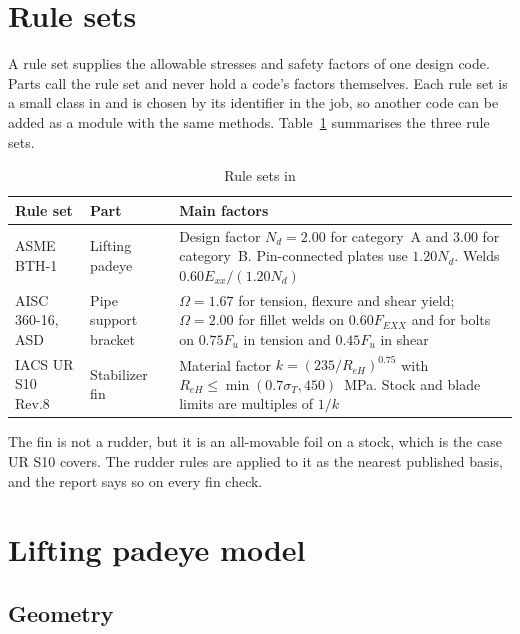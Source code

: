 \section{Rule sets}
\label{sec:rule-sets}

A rule set supplies the allowable stresses and safety factors of one design
code. Parts call the rule set and never hold a code's factors themselves. Each
rule set is a small class in  and is chosen by its identifier
in the job, so another code can be added as a module with the same methods.
Table~\ref{tab:rule-sets} summarises the three rule sets.

\begin{table}[H]
\centering
\caption{Rule sets in \NEMO{}}
\label{tab:rule-sets}
\small
\begin{tabularx}{\textwidth}{>{\raggedright\arraybackslash}p{}>{\raggedright\arraybackslash}p{}X}
\toprule
\textbf{Rule set} & \textbf{Part} & \textbf{Main factors}\\
\midrule
ASME BTH-1 \cite{asmeBTH1} & Lifting padeye & Design factor $N_d = 2.00$ for category~A and $3.00$ for category~B. Pin-connected plates use $1.20N_d$. Welds $0.60E_{xx}/(1.20N_d)$\\
AISC 360-16, ASD \cite{aisc2016} & Pipe support bracket & $\Omega = 1.67$ for tension, flexure and shear yield; $\Omega = 2.00$ for fillet welds on $0.60F_{EXX}$ and for bolts on $0.75F_u$ in tension and $0.45F_u$ in shear\\
IACS UR S10 Rev.8 \cite{iacsS10} & Stabilizer fin & Material factor $k = (235/R_{eH})^{0.75}$ with $R_{eH} \leq \min(0.7\sigma_T, 450)$~MPa. Stock and blade limits are multiples of $1/k$\\
\bottomrule
\end{tabularx}
\end{table}

The fin is not a rudder, but it is an all-movable foil on a stock, which is
the case UR S10 covers. The rudder rules are applied to it as the nearest
published basis, and the report says so on every fin check.

\section{Lifting padeye model}
\label{sec:padeye-model}

\subsection{Geometry}

